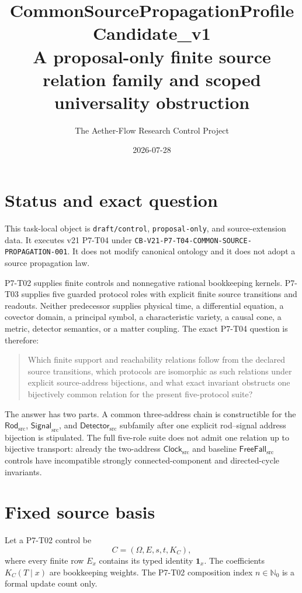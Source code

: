 \documentclass[11pt]{article}
\title{CommonSourcePropagationProfileCandidate\_v1\\
\large A proposal-only finite source relation family and scoped universality obstruction}
\author{The Aether-Flow Research Control Project}
\date{2026-07-28}
\newcommand{\Src}{\mathrm{src}}
\newcommand{\Clock}{\mathsf{Clock}_{\Src}}
\newcommand{\Rod}{\mathsf{Rod}_{\Src}}
\newcommand{\Signal}{\mathsf{Signal}_{\Src}}
\newcommand{\Detector}{\mathsf{Detector}_{\Src}}
\newcommand{\FreeFall}{\mathsf{FreeFall}_{\Src}}
\begin{document}
\maketitle

\section{Status and exact question}

This task-local object is \texttt{draft/control}, \texttt{proposal-only},
and source-extension data.  It executes v21 P7-T04 under
\texttt{CB-V21-P7-T04-COMMON-SOURCE-PROPAGATION-001}.  It does not modify
canonical ontology and it does not adopt a source propagation law.

P7-T02 supplies finite controls and nonnegative rational bookkeeping
kernels.  P7-T03 supplies five guarded protocol roles with explicit finite
source transitions and readouts.  Neither predecessor supplies physical
time, a differential equation, a covector domain, a principal symbol, a
characteristic variety, a causal cone, a metric, detector semantics, or a
matter coupling.  The exact P7-T04 question is therefore:

\begin{quote}
Which finite support and reachability relations follow from the declared
source transitions, which protocols are isomorphic as such relations under
explicit source-address bijections, and what exact invariant obstructs one
bijectively common relation for the present five-protocol suite?
\end{quote}

The answer has two parts.  A common three-address chain is constructible for
the \(\Rod\), \(\Signal\), and \(\Detector\) subfamily after one explicit
rod--signal address bijection is stipulated.  The full five-role suite does
not admit one relation up to bijective transport: already the two-address
\(\Clock\) and baseline \(\FreeFall\) controls have incompatible strongly
connected-component and directed-cycle invariants.

\section{Fixed source basis}

Let a P7-T02 control be
\[
  C=(\Omega,E,s,t,K_C),
\]
where every finite row \(E_x\) contains its typed identity
\(\mathbf 1_x\).  The coefficients \(K_C(T\mid x)\) are bookkeeping
weights.  The P7-T02 composition index \(n\in\mathbb N_0\) is a formal
update count only.
\end{document}
